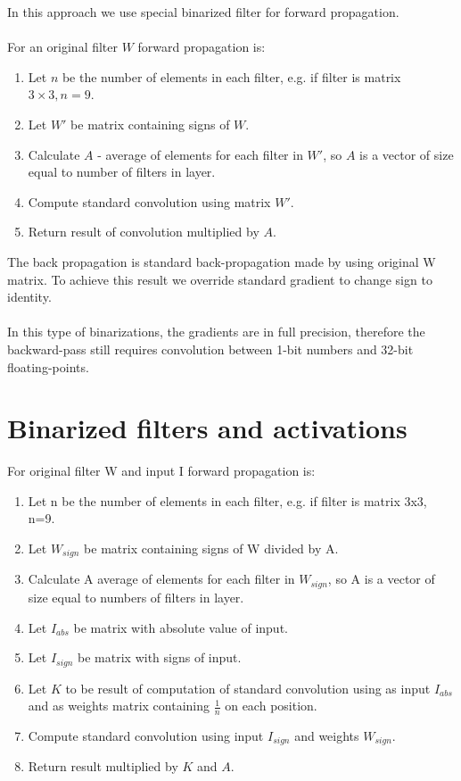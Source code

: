 \documentclass[licencjacka]{pracamgr}
\begin{document}
        In this approach we use special binarized filter for forward propagation.
        \\\\
        For an original filter $W$ forward propagation is:
        \begin{enumerate}
                \item Let $n$ be the number of elements in each filter, e.g. if filter is matrix $3 \times 3, n=9$.
                \item Let $W'$ be matrix containing signs of $W$.
                \item Calculate $A$ - average of elements for each filter in $W'$, so $A$ is a vector of size equal to number of filters in layer.
                \item Compute standard convolution using matrix $W'$.
                \item Return result of convolution multiplied by $A$.
        \end{enumerate}
        The back propagation is standard back-propagation made by using original W matrix. To achieve this result we override standard gradient to change sign to identity.
        \\\\
        In this type of binarizations, the gradients are in full precision, therefore the backward-pass still requires convolution between 1-bit numbers and 32-bit floating-points.

		\section{Binarized filters and activations}
		        For original filter W and input I forward propagation is:
		        \begin{enumerate}
		                \item Let n be the number of elements in each filter, e.g. if filter is matrix 3x3, n=9.
		                \item Let $W_{sign}$ be matrix containing signs of W divided by A.
		                \item Calculate A average of elements for each filter in $W_{sign}$, so A is a vector of size equal to numbers of filters in layer.
		                \item Let $I_{abs}$ be matrix with absolute value of input.
		                \item Let $I_{sign}$ be matrix with signs of input.
		                \item Let $K$ to be result of computation of standard convolution using as input $I_{abs}$ and as weights matrix containing $\frac{1}{n}$ on each position.
		                \item Compute standard convolution using input $I_{sign}$ and weights $W_{sign}$.
		                \item Return result multiplied by $K$ and $A$.
		        \end{enumerate}
\end{document}
